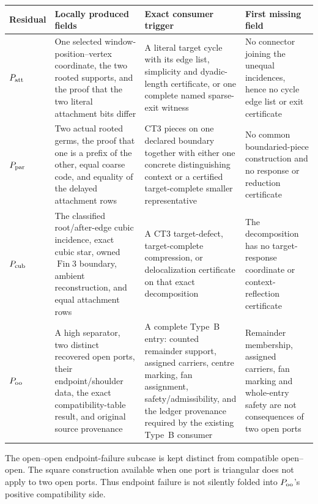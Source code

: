 \documentclass[11pt]{article}
\begin{document}
\begin{longtable}{>{\raggedright\arraybackslash}p{}
                  >{\raggedright\arraybackslash}p{}
                  >{\raggedright\arraybackslash}p{}
                  >{\raggedright\arraybackslash}p{}}
\toprule
Residual & Locally produced fields & Exact consumer trigger & First missing field \\
\midrule
$P_{\rm att}$ & One selected window-position--vertex coordinate, the two
rooted supports, and the proof that the two literal attachment bits differ &
A literal target cycle with its edge list, simplicity and dyadic-length
certificate, or one complete named sparse-exit witness & No connector joining
the unequal incidences, hence no cycle edge list or exit certificate \\
$P_{\rm par}$ & Two actual rooted germs, the proof that one is a prefix of the
other, equal coarse code, and equality of the delayed attachment rows & CT3
pieces on one declared boundary together with either one concrete
distinguishing context or a certified target-complete smaller representative
& No common boundaried-piece construction and no response or reduction
certificate \\
$P_{\rm cub}$ & The classified root/after-edge cubic incidence, exact cubic
star, owned $\operatorname{Fin}3$ boundary, ambient reconstruction, and equal
attachment rows & A CT3 target-defect, target-complete compression, or
delocalization certificate on that exact decomposition & The decomposition
has no target-response coordinate or context-reflection certificate \\
$P_{\rm oo}$ & A high separator, two distinct recovered open ports, their
endpoint/shoulder data, the exact compatibility-table result, and original
source provenance & A complete Type~B entry: counted remainder support,
assigned carriers, centre marking, fan assignment, safety/admissibility, and
the ledger provenance required by the existing Type~B consumer & Remainder
membership, assigned carriers, fan marking and whole-entry safety are not
consequences of two open ports \\
\bottomrule
\end{longtable}

The open--open endpoint-failure subcase is kept distinct from compatible
open--open.  The square construction available when one port is triangular
does not apply to two open ports.  Thus endpoint failure is not silently
folded into $P_{\rm oo}$'s positive compatibility side.
\end{document}
